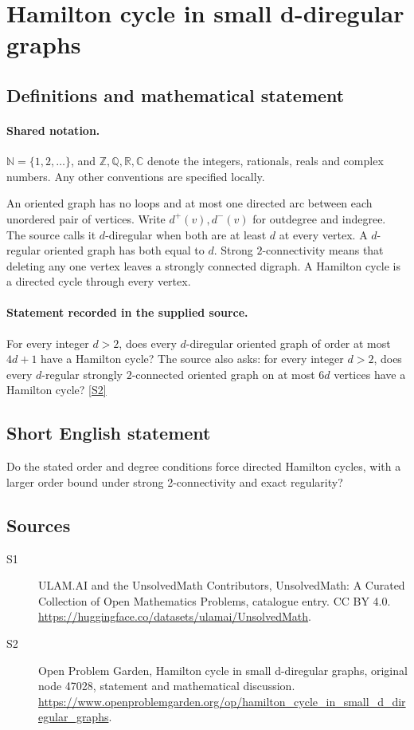 \documentclass[11pt]{article}
\newcommand{\sref}[2]{\hyperlink{source:#1:#2}{[S#2]}}
\begin{document}
\section{Hamilton cycle in small d-diregular graphs}\label{statement}

\subsection{Definitions and mathematical statement}

\paragraph{Shared notation.}$\mathbb N=\{1,2,\ldots\}$, and $\mathbb Z,\mathbb Q,\mathbb R,\mathbb C$ denote the integers, rationals, reals and complex numbers. Any other conventions are specified locally.


An oriented graph has no loops and at most one directed arc between each unordered pair of vertices. Write $d^+(v),d^-(v)$ for outdegree and indegree. The source calls it $d$-diregular when both are at least $d$ at every vertex. A $d$-regular oriented graph has both equal to $d$. Strong $2$-connectivity means that deleting any one vertex leaves a strongly connected digraph. A Hamilton cycle is a directed cycle through every vertex.
\paragraph{Statement recorded in the supplied source.}
For every integer $d>2$, does every $d$-diregular oriented graph of order at most $4d+1$ have a Hamilton cycle? The source also asks: for every integer $d>2$, does every $d$-regular strongly $2$-connected oriented graph on at most $6d$ vertices have a Hamilton cycle? \sref{statement}{2}
\subsection{Short English statement}
Do the stated order and degree conditions force directed Hamilton cycles, with a larger order bound under strong 2-connectivity and exact regularity?
\subsection{Sources}
\begin{description}
\item[\hypertarget{source:statement:1}{S1}] ULAM.AI and the UnsolvedMath Contributors, UnsolvedMath: A Curated Collection of Open Mathematics Problems, catalogue entry. CC BY 4.0. \url{https://huggingface.co/datasets/ulamai/UnsolvedMath}.
\item[\hypertarget{source:statement:2}{S2}] Open Problem Garden, Hamilton cycle in small d-diregular graphs, original node 47028, statement and mathematical discussion. \url{https://www.openproblemgarden.org/op/hamilton_cycle_in_small_d_diregular_graphs}.
\end{description}
\label{end:statement}
\end{document}
